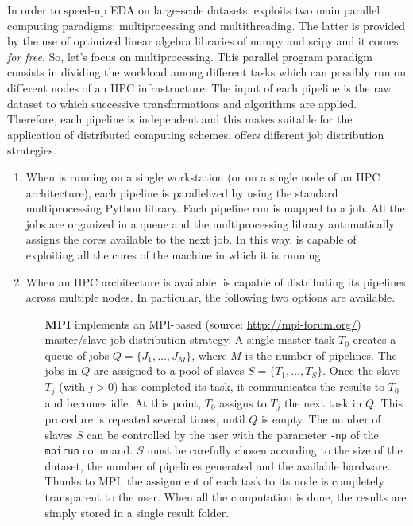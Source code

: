 In order to speed-up EDA on large-scale datasets, \ade exploits two main parallel computing paradigms: multiprocessing and multithreading. The latter is provided by the use of optimized linear algebra libraries of {\sc numpy} and {\sc scipy} and it comes \textit{for free}. So, let's focus on multiprocessing.
This parallel program paradigm consists in dividing the workload among different tasks which can possibly run on different nodes of an HPC infrastructure.
The input of each \ade pipeline is the raw dataset to which successive transformations and algorithms are applied. Therefore, each pipeline is independent and this makes \ade suitable for the application of distributed computing schemes.
\ade offers different job distribution strategies.
\begin{enumerate}
	\item When \ade is running on a single workstation (or on a single node of an HPC architecture), each pipeline is parallelized by using the standard multiprocessing Python library.
	Each pipeline run is mapped to a job. All the jobs are organized in a queue and the multiprocessing library automatically assigns the cores available to the next job.
	In this way, \ade is capable of exploiting all the cores of the machine in which it is running.
	
	\item When an HPC architecture is available, \ade is capable of distributing its pipelines across multiple nodes. In particular, the following two options are available.
	\begin{enumerate}
		\item[\textbf{MPI}] \ade implements an MPI-based (source: \url{http://mpi-forum.org/}) master/slave job distribution strategy.
		A single master task $T_0$ creates a queue of jobs $Q = \{J_1, \dots, J_M\}$, where $M$ is the number of pipelines. The jobs in $Q$ are assigned to a pool of slaves $S = \{T_1, \dots, T_S\}$.
		Once the slave $T_j$ (with $j>0$) has completed its task, it communicates the results to $T_0$ and becomes idle. At this point, $T_0$ assigns to $T_j$ the next task in $Q$. This procedure is repeated several times, until $Q$ is empty.
		The number of slaves $S$ can be controlled by the user with the parameter {\tt -np} of the {\tt mpirun} command. $S$ must be carefully chosen according to the size of the dataset, the number of pipelines generated and the available hardware.
		Thanks to MPI, the assignment of each task to its node is completely transparent to the user. When all the computation is done, the results are simply stored in a single result folder.


\end{enumerate}
\end{enumerate}

